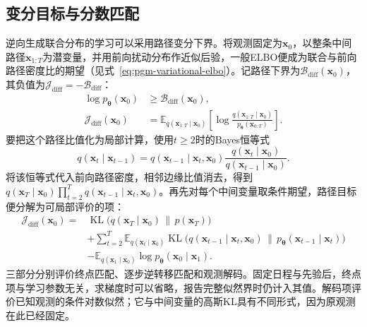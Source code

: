 \subsection{变分目标与分数匹配}
\label{sec:pgm-generative-diffusion-objective}

逆向生成联合分布的学习可以采用路径变分下界。将观测固定为$\bm{x}_0$，以整条中间路径$\bm{x}_{1:T}$为潜变量，并用前向扰动分布作近似后验，一般ELBO便成为联合与前向路径密度比的期望（见式~\eqref{eq:pgm-variational-elbo}）。记路径下界为$\mathcal{B}_{\mathrm{diff}}(\bm{x}_0)$，其负值为$\mathcal{J}_{\mathrm{diff}}=-\mathcal{B}_{\mathrm{diff}}$：
\begin{equation}
  \label{eq:pgm-generative-path-elbo}
  \begin{aligned}
    \log p_{\bm{\theta}}(\bm{x}_0)
      &\geq\mathcal{B}_{\mathrm{diff}}(\bm{x}_0),\\
    \mathcal{J}_{\mathrm{diff}}(\bm{x}_0)
      &=\mathbb{E}_{q(\bm{x}_{1:T}\mid\bm{x}_0)}
         \left[\log
           \frac{q(\bm{x}_{1:T}\mid\bm{x}_0)}
                {p_{\bm{\theta}}(\bm{x}_{0:T})}
         \right].
  \end{aligned}
\end{equation}
要把这个路径比值化为局部计算，使用$t\geq2$时的Bayes恒等式
\[
  q(\bm{x}_t\mid\bm{x}_{t-1})
  =q(\bm{x}_{t-1}\mid\bm{x}_t,\bm{x}_0)
     \frac{q(\bm{x}_t\mid\bm{x}_0)}
          {q(\bm{x}_{t-1}\mid\bm{x}_0)}.
\]
将该恒等式代入前向路径密度，相邻边缘比值消去，得到$q(\bm{x}_T\mid\bm{x}_0)\prod_{t=2}^{T}q(\bm{x}_{t-1}\mid\bm{x}_t,\bm{x}_0)$。再先对每个中间变量取条件期望，路径目标便分解为可局部评价的项：
\begin{equation}
  \label{eq:pgm-generative-ddpm-kl}
  \begin{aligned}
    \mathcal{J}_{\mathrm{diff}}(\bm{x}_0)
      ={}&\operatorname{KL}\bigl(
          q(\bm{x}_T\mid\bm{x}_0)\,\|\,p(\bm{x}_T)\bigr)\\
       &+\sum_{t=2}^{T}
         \mathbb{E}_{q(\bm{x}_t\mid\bm{x}_0)}
          \operatorname{KL}\bigl(
           q(\bm{x}_{t-1}\mid\bm{x}_t,\bm{x}_0)
           \,\|\,p_{\bm{\theta}}(\bm{x}_{t-1}\mid\bm{x}_t)
                         \bigr)\\
       &-\mathbb{E}_{q(\bm{x}_1\mid\bm{x}_0)}
          \log p_{\bm{\theta}}(\bm{x}_0\mid\bm{x}_1).
  \end{aligned}
\end{equation}
三部分分别评价终点匹配、逐步逆转移匹配和观测解码。固定日程与先验后，终点项与学习参数无关，求梯度时可以省略，报告完整似然界时仍计入其值。解码项评价已知观测的条件对数似然；它与中间变量的高斯KL具有不同形式，因为原观测在此已经固定。

